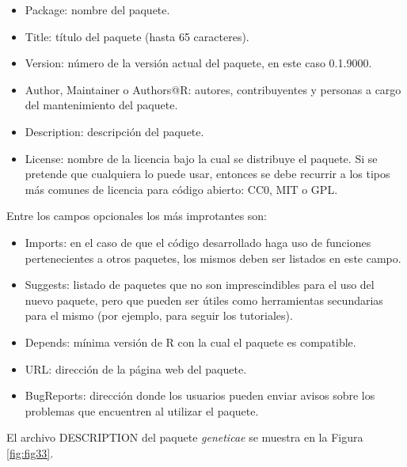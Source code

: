 \begin{itemize}
\item Package: nombre del paquete.
\item Title: título del paquete (hasta 65 caracteres).
\item Version: número de la versión actual del paquete, en este caso 0.1.9000.
\item Author, Maintainer o Authors@R: autores, contribuyentes y personas a cargo del mantenimiento del paquete.
\item Description: descripción del paquete.
\item License: nombre de la licencia bajo la cual se distribuye el paquete. Si se pretende que cualquiera lo puede usar, entonces se debe recurrir a los tipos más comunes de licencia para código abierto: CC0, MIT o GPL. 
\end{itemize}

Entre los campos opcionales los más improtantes son:
\begin{itemize}
\item Imports: en el caso de que el código desarrollado haga uso de funciones pertenecientes a otros paquetes, los mismos deben ser listados en este campo.
\item Suggests: listado de paquetes que no son imprescindibles para el uso del nuevo paquete, pero que pueden ser útiles como herramientas secundarias para el mismo (por ejemplo, para seguir los tutoriales).
\item Depends: mínima versión de R con la cual el paquete es compatible.
\item URL: dirección de la página web del paquete.
\item BugReports: dirección donde los usuarios pueden enviar avisos sobre los problemas que encuentren al utilizar el paquete.
\end{itemize}

El archivo DESCRIPTION del paquete \emph{geneticae} se muestra en la Figura \ref{fig:fig33}.

